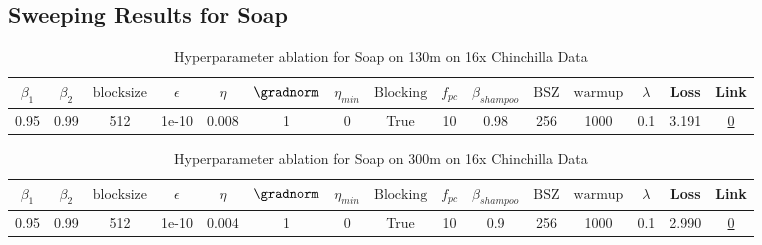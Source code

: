 \subsection{Sweeping Results for Soap}%
\begin{table}[H]
\centering
\caption{Hyperparameter ablation for Soap on 130m on 16x Chinchilla Data}
\label{tab:ablation_soap_130m_on_16x_chinchilla_data}
\begin{tabular}{ccccccccccccccc}
\toprule
$\beta_1$ & $\beta_2$ & $\mathrm{block size}$ & $\epsilon$ & $\eta$ & $\gradnorm$ & $\eta_{min}$ & $\mathrm{Blocking}$ & $f_{pc}$ & $\beta_{shampoo}$ & $\mathrm{BSZ}$ & $\mathrm{warmup}$ & $\lambda$ & Loss & Link \\
\midrule
0.95 & 0.99 & 512 & 1e-10 & 0.008 & 1 & 0 & True & 10 & 0.98 & 256 & 1000 & 0.1 & 3.191 & \href{https://wandb.ai/stanford-mercury/optimizer-scaling/runs/sweep-130m-42B-soape1786aelr0.008-wd0.1-minlr0-warmup1000-b10.95-c390d2}{0} \\
\midrule
\bottomrule
\end{tabular}
\end{table}

\begin{table}[H]
\centering
\caption{Hyperparameter ablation for Soap on 300m on 16x Chinchilla Data}
\label{tab:ablation_soap_300m_on_16x_chinchilla_data}
\begin{tabular}{ccccccccccccccc}
\toprule
$\beta_1$ & $\beta_2$ & $\mathrm{block size}$ & $\epsilon$ & $\eta$ & $\gradnorm$ & $\eta_{min}$ & $\mathrm{Blocking}$ & $f_{pc}$ & $\beta_{shampoo}$ & $\mathrm{BSZ}$ & $\mathrm{warmup}$ & $\lambda$ & Loss & Link \\
\midrule
0.95 & 0.99 & 512 & 1e-10 & 0.004 & 1 & 0 & True & 10 & 0.9 & 256 & 1000 & 0.1 & 2.990 & \href{https://wandb.ai/stanford-mercury/optimizer-scaling/runs/sweep-300m-96B-soapef479bb0lr0.004-wd0.1-minlr0-warmup1000-b10.9-ef8190}{0} \\
\midrule
\bottomrule
\end{tabular}
\end{table}

